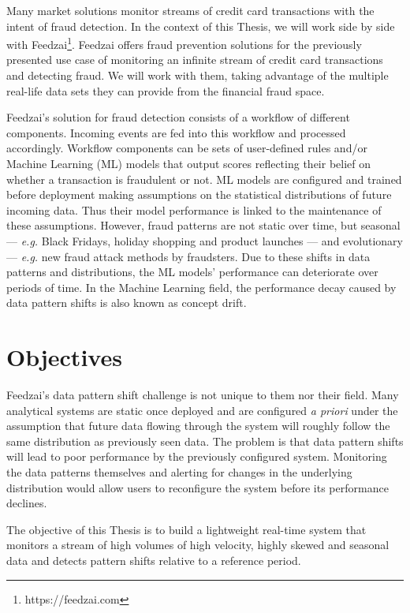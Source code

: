 Many market solutions monitor streams of credit card transactions with the intent of fraud detection. In the context of this Thesis, we will work side by side with Feedzai\footnote{https://feedzai.com}. Feedzai offers fraud prevention solutions for the previously presented use case of monitoring an infinite stream of credit card transactions and detecting fraud. We will work with them, taking advantage of the multiple real-life data sets they can provide from the financial fraud space. 

Feedzai's solution for fraud detection consists of a workflow of different components. Incoming events are fed into this workflow and processed accordingly. Workflow components can be sets of user-defined rules and/or Machine Learning (ML) models that output scores reflecting their belief on whether a transaction is fraudulent or not. ML models are configured and trained before deployment making assumptions on the statistical distributions of future incoming data. Thus their model performance is linked to the maintenance of these assumptions. However, fraud patterns are not static over time, but seasonal --- \textit{e.g.} Black Fridays, holiday shopping and product launches --- and evolutionary --- \textit{e.g.} new fraud attack methods by fraudsters. Due to these shifts in data patterns and distributions, the ML models' performance can deteriorate over periods of time. In the Machine Learning field, the performance decay caused by data pattern shifts is also known as concept drift.

\section{Objectives} \label{sec:objectives}
Feedzai's data pattern shift challenge is not unique to them nor their field. Many analytical systems are static once deployed and are configured \textit{a priori} under the assumption that future data flowing through the system will roughly follow the same distribution as previously seen data.
The problem is that data pattern shifts will lead to poor performance by the previously configured system. Monitoring the data patterns themselves and alerting for changes in the underlying distribution would allow users to reconfigure the system before its performance declines.

The objective of this Thesis is to build a lightweight real-time system that monitors a stream of high volumes of high velocity, highly skewed and seasonal data and detects pattern shifts relative to a reference period.

